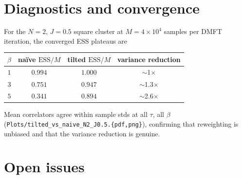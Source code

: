 \documentclass[11pt]{article}
\begin{document}
\section{Diagnostics and convergence}
\label{sec:results}

For the $N=2$, $J=0.5$ square cluster at $M = 4\times10^4$ samples
per DMFT iteration, the converged ESS plateaus are
\begin{center}
\begin{tabular}{c|cc|c}
$\beta$ & naïve $\mathrm{ESS}/M$ & tilted $\mathrm{ESS}/M$ & variance reduction \\
\hline
$1$ & $0.994$ & $1.000$ & $\sim$1$\times$ \\
$3$ & $0.751$ & $0.947$ & $\sim$1.3$\times$ \\
$5$ & $0.341$ & $0.894$ & $\sim$2.6$\times$ \\
\end{tabular}
\end{center}
Mean correlators agree within sample stds at all $\tau$, all $\beta$
(\verb!Plots/tilted_vs_naive_N2_J0.5.{pdf,png}!), confirming that
reweighting is unbiased and that the variance reduction is genuine.

\section{Open issues}
\end{document}
